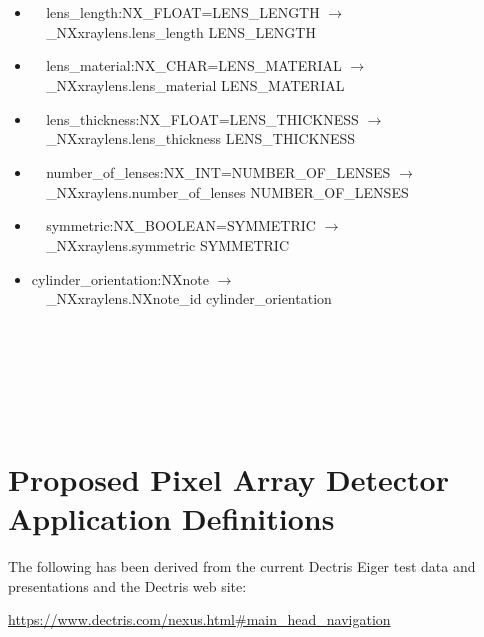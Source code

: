 \documentclass[11pt]{article}
\begin{document}
{{\begin{itemize}
\item{\verb|  |lens\_length:NX\_FLOAT=LENS\_LENGTH $\rightarrow$\\
\verb|  |\_NXxraylens.lens\_length LENS\_LENGTH}

\item{\verb|  |lens\_material:NX\_CHAR=LENS\_MATERIAL $\rightarrow$\\
\verb|  |\_NXxraylens.lens\_material LENS\_MATERIAL}

\item{\verb|  |lens\_thickness:NX\_FLOAT=LENS\_THICKNESS $\rightarrow$\\
\verb|  |\_NXxraylens.lens\_thickness LENS\_THICKNESS}

\item{\verb|  |number\_of\_lenses:NX\_INT=NUMBER\_OF\_LENSES $\rightarrow$\\
\verb|  |\_NXxraylens.number\_of\_lenses NUMBER\_OF\_LENSES}

\item{\verb|  |symmetric:NX\_BOOLEAN=SYMMETRIC $\rightarrow$\\
\verb|  |\_NXxraylens.symmetric SYMMETRIC}

\item{cylinder\_orientation:NXnote $\rightarrow$\\
\verb|  |\_NXxraylens.NXnote\_id cylinder\_orientation}
\end{itemize}

~~\\

~~\\

~~\\

~~\\

~~\\

\goodbreak



\section{Proposed Pixel Array Detector Application Definitions}
\label{Proposed Pixel Array Detector Application Definitions}

The following has been derived from the current Dectris Eiger test data and
presentations and the Dectris web site: 

\url{https://www.dectris.com/nexus.html#main_head_navigation}  

}}
\end{document}
